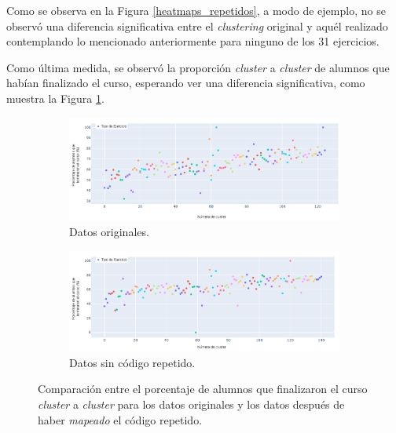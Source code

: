 \documentclass[11pt,a4paper,twoside,openany]{tesis}
\begin{document}
Como se observa en la Figura \ref{heatmaps_repetidos}, a modo de ejemplo, no se observó una diferencia significativa entre el \emph{clustering} original y aquél realizado contemplando lo mencionado anteriormente para ninguno de los 31 ejercicios.

Como última medida, se observó la proporción \emph{cluster} a \emph{cluster} de alumnos que habían finalizado el curso, esperando ver una diferencia significativa, como muestra la Figura \ref{porcentajes}.

\begin{figure}[H]
    \centering
    \begin{subfigure}{0.45\textwidth}
        \includegraphics[width=\linewidth]{imagenes/porcentaje - original.png}
        \caption{Datos originales.}
    \end{subfigure}
    \hfill
    \begin{subfigure}{0.45\textwidth}
        \includegraphics[width=\linewidth]{imagenes/porcentaje - unniques.png}
        \caption{Datos sin código repetido.}
    \end{subfigure}
    \caption{Comparación entre el porcentaje de alumnos que finalizaron el curso \emph{cluster} a \emph{cluster} para los datos originales y los datos después de haber \emph{mapeado} el código repetido.}
    \label{porcentajes}
\end{figure}
\end{document}
